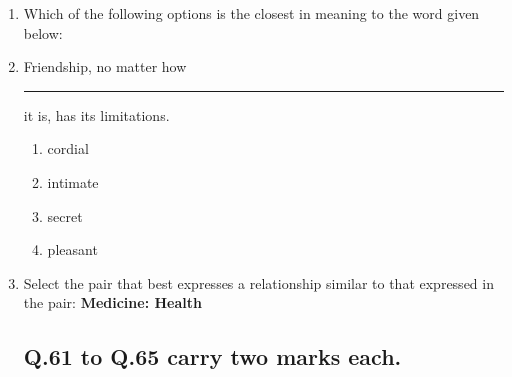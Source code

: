 \documentclass[journal,12pt,onecolumn]{IEEEtran}
\theoremstyle{remark}
\begin{document}
\begin{enumerate}[start = 26 ]
        \item Which of the following options is the closest in meaning to the word given below:
        \hfill{}
            \begin{enumerate}
            \end{enumerate}

        \item Friendship, no matter how \rule{3cm}{0.15mm} it is, has its limitations.\hfill{}
            \begin{enumerate}
                    \item cordial
                    \item intimate
                    \item secret
                    \item pleasant
            \end{enumerate}

        \item Select the pair that best expresses a relationship similar to that expressed in the pair: \textbf{Medicine: Health} \hfill{}
            \begin{enumerate}
            \end{enumerate}
\subsection{Q.61 to Q.65 carry two marks each. }


\end{enumerate}
\end{document}
